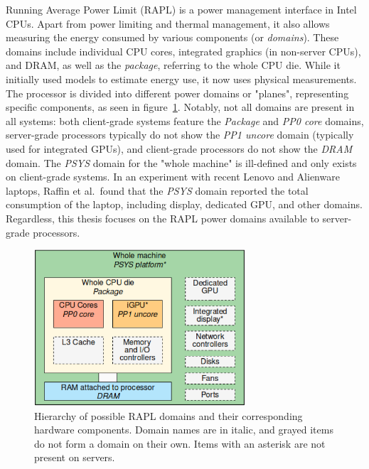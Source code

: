 Running Average Power Limit (RAPL) is a power management interface in Intel CPUs. Apart from power limiting and thermal management, it also allows measuring the energy consumed by various components (or \textit{domains}). These domains include individual CPU cores, integrated graphics (in non-server CPUs), and DRAM, as well as the \textit{package}, referring to the whole CPU die. While it initially used models to estimate energy use\parencite{hackenberg2015energy}, it now uses physical measurements. The processor is divided into different power domains or "planes", representing specific components, as seen in figure~\ref{fig:rapl_domains}. Notably, not all domains are present in all systems: both client-grade systems feature the \textit{Package} and \textit{PP0 core} domains, server-grade processors typically do not show the \textit{PP1 uncore} domain (typically used for integrated GPUs), and client-grade processors do not show the \textit{DRAM} domain. The \textit{PSYS} domain for the "whole machine" is ill-defined and only exists on client-grade systems. In an experiment with recent Lenovo and Alienware laptops, Raffin et al.\ found that the \textit{PSYS} domain reported the total consumption of the laptop, including display, dedicated GPU, and other domains. Regardless, this thesis focuses on the RAPL power domains available to server-grade processors.

\begin{figure}[ht]
    \centering
    \includegraphics[width=0.7\textwidth]{Figures/rapl_domains.png}
    \caption[Rapl domains]{Hierarchy of possible RAPL domains and their corresponding hardware components. Domain names are in italic, and grayed items do not form a domain on their own. Items with an asterisk are not present on servers\parencite{raffin2024dissecting}.}
    \label{fig:rapl_domains}
\end{figure}

